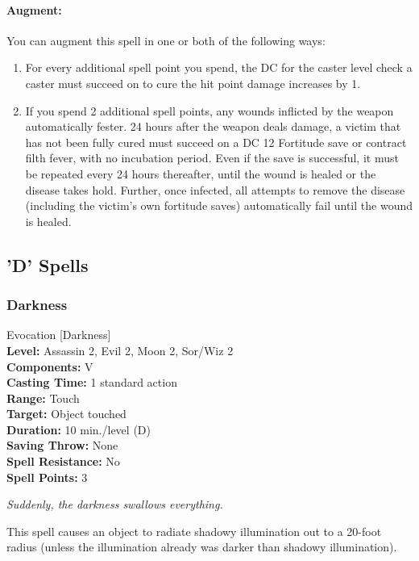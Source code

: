 \paragraph{Augment:} You can augment this spell in one or both of the following ways:
\begin{enumerate}
 \item For every additional spell point you spend, the DC for the caster level check a caster must succeed on to cure the hit point damage increases by 1.
 \item If you spend 2 additional spell points, any wounds inflicted by the weapon automatically fester. 24 hours after the weapon deals damage, a victim that has not been fully cured must succeed on a DC 12 Fortitude save or contract filth fever, with no incubation period. Even if the save is successful, it must be repeated every 24 hours thereafter, until the wound is healed or the disease takes hold. Further, once infected, all attempts to remove the disease (including the victim's own fortitude saves) automatically fail until the wound is healed.
\end{enumerate}


\subsection{'D' Spells}
\subsubsection{Darkness}
\label{Spell:Darkness}
Evocation [Darkness]
\\ \textbf{Level:} Assassin 2, Evil 2, Moon 2, Sor/Wiz 2
\\ \textbf{Components:} V
\\ \textbf{Casting Time:} 1 standard action
\\ \textbf{Range:} Touch
\\ \textbf{Target:} Object touched
\\ \textbf{Duration:} 10 min./level (D)
\\ \textbf{Saving Throw:} None
\\ \textbf{Spell Resistance:} No
\\ \textbf{Spell Points:} 3

\emph{Suddenly, the darkness swallows everything.}

This spell causes an object to radiate shadowy illumination out to a 20-foot radius 
(unless the illumination already was darker than shadowy illumination).

